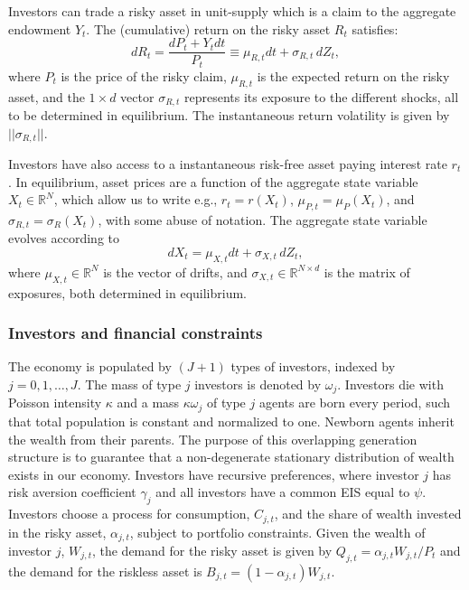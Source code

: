 Investors can trade a risky asset in unit-supply which is a claim to the aggregate endowment $Y_t$. The (cumulative) return on the risky asset $R_t$ satisfies:
\begin{equation}\label{eq:risky-asser-ret}
    d R_t = \frac{d P_t + Y_t dt}{P_t} \equiv \mu_{R,t} dt + \sigma_{R,t}\, d Z_t,
\end{equation}
where $P_t$ is the price of the risky claim, $\mu_{R,t}$ is the expected return on the risky asset, and the $1\times d$ vector $\sigma_{R,t}$ represents its exposure to the different shocks, all to be determined in equilibrium. The instantaneous return volatility is given by $||\sigma_{R,t}||$.

Investors have also access to a instantaneous risk-free asset paying interest rate $r_t$. In equilibrium, asset prices are a function of the aggregate state variable $X_t\in \mathbb{R}^{N}$, which allow us to write e.g., $r_t = r(X_t)$, $\mu_{P,t} = \mu_P(X_t)$, and $\sigma_{R,t} = \sigma_R(X_t)$, with some abuse of notation. The aggregate state variable evolves according to
\begin{equation}
    d X_t = \mu_{X,t} dt + \sigma_{X,t}\, d Z_t,
\end{equation}
where $\mu_{X,t} \in \mathbb{R}^N$ is the vector of drifts, and $\sigma_{X,t} \in \mathbb{R}^{N\times d}$ is the matrix of exposures, both determined in equilibrium. 

\subsubsection{Investors and financial constraints}

The economy is populated by $(J+1)$ types of investors, indexed by $j = 0, 1, \ldots, J$. The mass of type $j$ investors is denoted by $\omega_j$. Investors die with Poisson intensity $\kappa$ and a mass $\kappa \omega_j$ of type $j$ agents are born every period, such that total population is constant and normalized to one. 
Newborn agents inherit the wealth from their parents.
The purpose of this overlapping generation structure is to guarantee that a non-degenerate stationary distribution of wealth exists in our economy. 
Investors have \citet{duffie1992stochastic} recursive preferences, where investor $j$ has risk aversion coefficient $\gamma_j$ and all investors have a common EIS equal to $\psi$. Investors choose a process for consumption, $C_{j,t}$, and the share of wealth invested in the risky asset, $\alpha_{j,t}$, subject to portfolio constraints.
Given the wealth of investor $j$, $W_{j,t}$, the demand for the risky asset is given by $Q_{j,t} = \alpha_{j,t} W_{j,t} / P_t$ and the demand for the riskless asset is $B_{j,t} = (1-\alpha_{j,t}) W_{j,t}$.


